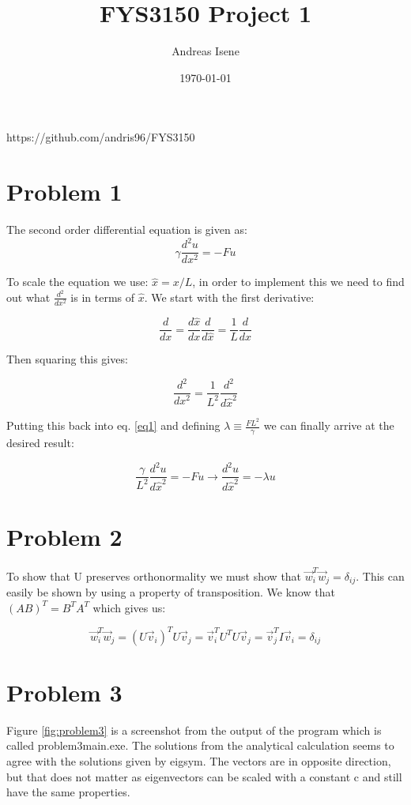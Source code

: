 \documentclass[english,notitlepage]{revtex4-1}
\begin{document}
	
	\title{FYS3150 Project 1}      
	\author{Andreas Isene}         
	\date{\today}                             
	\noaffiliation                          
	
	
	\maketitle 
	
	https://github.com/andris96/FYS3150
	
	\section*{Problem 1}
	The second order differential equation is given as:
		$$\gamma \frac{d^2u}{dx^2} = -Fu$$

	
	To scale the equation we use: $\hat{x} = x/L$, in order to implement this we need to find out what $\frac{d^2}{dx^2}$ is in terms of $\hat{x}$. We start with the first derivative:
	
	$$\frac{d}{dx} = \frac{d\hat{x}}{dx}\frac{d}{d\hat{x}} = \frac{1}{L}\frac{d}{d\hat{x}}$$
	
	Then squaring this gives:
	
	$$\frac{d^2}{dx^2} = \frac{1}{L^2}\frac{d^2}{d\hat{x}^2}$$
	
	Putting this back into eq. \ref{eq1} and defining $\lambda \equiv \frac{FL^2}{\gamma}$ we can finally arrive at the desired result:
	
	$$ \frac{\gamma}{L^2} \frac{d^2u}{d\hat{x}^2} = -Fu \rightarrow \frac{d^2u}{d\hat{x}^2} = -\lambda u$$
	
	
	\section*{Problem 2}
	To show that U preserves orthonormality we must show that $ \vec{w}_i^T\vec{w}_j = \delta_{ij}$. This can easily be shown by using a property of transposition. We know that $(AB)^T = B^T A^T$ which gives us: 

	$$ \vec{w}_i^T\vec{w}_j = (U\vec{v}_i)^T U\vec{v}_j = \vec{v}_i^T U^T U \vec{v}_j = \vec{v}_j^TI\vec{v}_i = \delta_{ij}$$ 

	
	\section*{Problem 3}
	
	Figure \ref{fig:problem3} is a screenshot from the output of the program which is called problem3\textunderscore main.exe. The solutions from the analytical calculation seems to agree with the solutions given by eig\textunderscore sym. The vectors are in opposite direction, but that does not matter as eigenvectors can be scaled with a constant c and still have the same properties.
	
\end{document}
